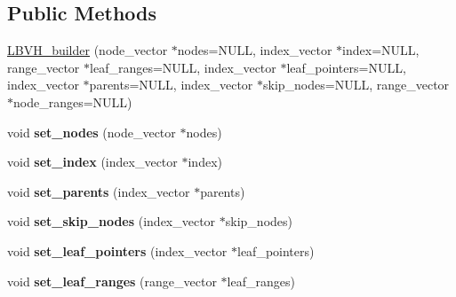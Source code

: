 \subsection*{Public Methods}
\begin{DoxyCompactItemize}
\item 
\hyperlink{structcugar_1_1cuda_1_1_l_b_v_h__builder_ad2cafc8f7671ebbef3de1abeef7fa766}{L\+B\+V\+H\+\_\+builder} (node\+\_\+vector $\ast$nodes=N\+U\+LL, index\+\_\+vector $\ast$index=N\+U\+LL, range\+\_\+vector $\ast$leaf\+\_\+ranges=N\+U\+LL, index\+\_\+vector $\ast$leaf\+\_\+pointers=N\+U\+LL, index\+\_\+vector $\ast$parents=N\+U\+LL, index\+\_\+vector $\ast$skip\+\_\+nodes=N\+U\+LL, range\+\_\+vector $\ast$node\+\_\+ranges=N\+U\+LL)
\item 
\mbox{\label{structcugar_1_1cuda_1_1_l_b_v_h__builder_aa6cc3f6681a0f8b2d0b8f901ea2b59f3}} 
void {\bfseries set\+\_\+nodes} (node\+\_\+vector $\ast$nodes)
\item 
\mbox{\label{structcugar_1_1cuda_1_1_l_b_v_h__builder_a4c3f8a21e560d6080976832b893d3be1}} 
void {\bfseries set\+\_\+index} (index\+\_\+vector $\ast$index)
\item 
\mbox{\label{structcugar_1_1cuda_1_1_l_b_v_h__builder_a11c97b820d063fabf9ba1f3118c44c49}} 
void {\bfseries set\+\_\+parents} (index\+\_\+vector $\ast$parents)
\item 
\mbox{\label{structcugar_1_1cuda_1_1_l_b_v_h__builder_a43352b876b36408051b2cc2d05f1fb7d}} 
void {\bfseries set\+\_\+skip\+\_\+nodes} (index\+\_\+vector $\ast$skip\+\_\+nodes)
\item 
\mbox{\label{structcugar_1_1cuda_1_1_l_b_v_h__builder_a27167dc98d5d8933e42f8eca0663ce32}} 
void {\bfseries set\+\_\+leaf\+\_\+pointers} (index\+\_\+vector $\ast$leaf\+\_\+pointers)
\item 
\mbox{\label{structcugar_1_1cuda_1_1_l_b_v_h__builder_ab75c51d1c806ddba42bbc2bf995541d3}} 
void {\bfseries set\+\_\+leaf\+\_\+ranges} (range\+\_\+vector $\ast$leaf\+\_\+ranges)
\item 

\end{DoxyCompactItemize}
